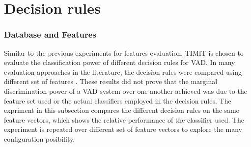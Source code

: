 \section{Decision rules}

\subsubsection{Database and Features}
Similar to the previous experiments for features evaluation, TIMIT is chosen to evaluate the classification power of different decision rules for VAD. In many evaluation approaches in the literature, the decision rules were compared using different set of features \cite{}. These results did not prove that the marginal discrimination power of a VAD system over one another achieved was due to the feature set used or the actual classifiers employed in the decision rules. The expriment in this subsection compares the different decision rules on the same feature vectors, which shows the relative performance of the classifier used. The experiment is repeated over different set of feature vectors to explore the many configuration posibility.

